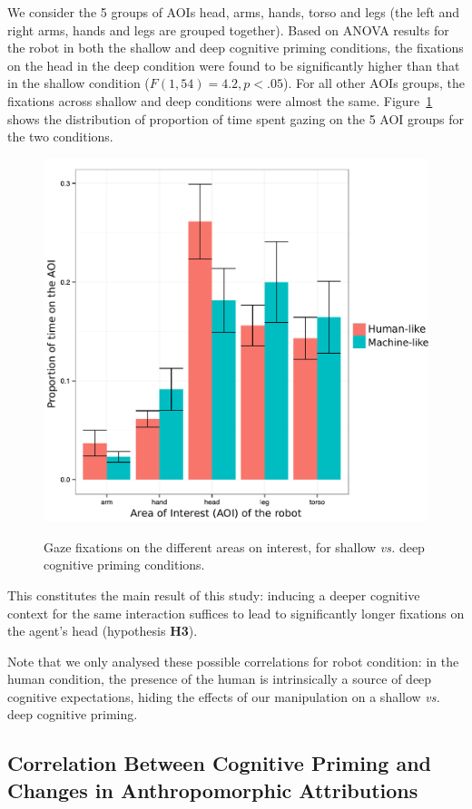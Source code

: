 \documentclass[lettersize, noapacite, twoside, HRI]{apa_HRI}
\newcommand{\vs}{\textit{vs.}\xspace}
\newcommand{\h}[1]{\textbf{H#1}\xspace}
\begin{document}
We consider the 5 groups of AOIs {\sf head}, {\sf arms}, {\sf hands}, {\sf
torso} and {\sf legs} (the left and right arms, hands and legs are grouped
together). Based on ANOVA results for the robot in both the shallow and deep
cognitive priming conditions, the fixations on the head in the deep condition
were found to be significantly higher than that in the shallow condition
($F(1,54) = 4.2, p < .05$). For all other AOIs groups, the fixations across
shallow and deep conditions were almost the same. Figure~\ref{h3} shows the
distribution of proportion of time spent gazing on the 5 AOI groups for the two
conditions.

\begin{figure}[ht!]
    \centering
    \includegraphics[width=0.6\columnwidth]{GazeHighLow}\label{GazeHighLow}
    \caption{Gaze fixations on the different areas on interest, for shallow \vs
    deep cognitive priming conditions.}
    \label{h3}
\end{figure}

This constitutes the main result of this study: inducing a deeper cognitive
context for the same interaction suffices to lead to significantly longer
fixations on the agent's head (hypothesis \h{3}).

Note that we only analysed these possible correlations for robot condition: in
the human condition, the presence of the human is intrinsically a source of deep
cognitive expectations, hiding the effects of our manipulation on a shallow \vs deep
cognitive priming.


\subsection{Correlation Between Cognitive Priming and Changes in Anthropomorphic
Attributions}
\end{document}
